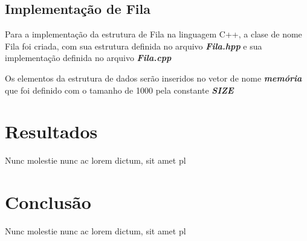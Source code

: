 \documentclass[rascunho,xindy,sublist]{fei}
\begin{document}
\section{Implementação de Fila}

Para a implementação da estrutura de Fila na linguagem C++, a clase de nome Fila foi criada, com sua estrutura definida no arquivo \textbf{\textit{Fila.hpp}} e sua implementação definida no arquivo \textbf{\textit{Fila.cpp}}

Os elementos da estrutura de dados serão inseridos no vetor de nome  \textbf{\textit{memória}} que foi definido com o tamanho de 1000 pela constante \textbf{\textit{SIZE}} 

\chapter{Resultados}

Nunc molestie nunc ac lorem dictum, sit amet pl

\chapter{Conclusão}

Nunc molestie nunc ac lorem dictum, sit amet pl

\printbibliography

\printindex
\end{document}
